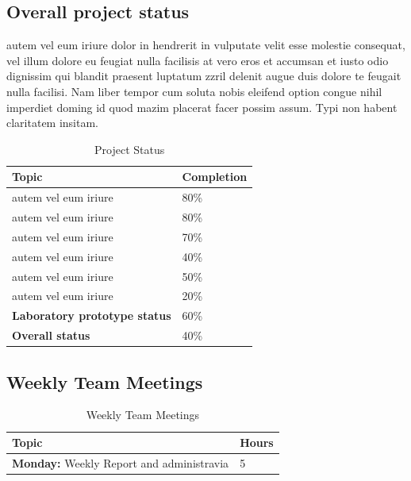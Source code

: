\documentclass[12pt,journal]{IEEEtran}
\begin{document}
	\subsection{Overall project status}
	autem vel eum iriure dolor in hendrerit in vulputate velit esse molestie consequat, vel illum dolore 
	eu feugiat nulla facilisis at vero eros et accumsan et iusto odio dignissim qui blandit praesent luptatum 
	zzril delenit augue duis dolore te feugait nulla facilisi. Nam liber tempor cum soluta nobis eleifend option 
	congue nihil imperdiet doming id quod mazim placerat facer possim assum. Typi non habent claritatem insitam.
	\begin{table}[H]
		\renewcommand{\arraystretch}{1.3}
		\caption{Project Status}
		\label{Project Status}
		\centering
		\begin{tabular}{p{4cm}|p{2cm}}
			\hline
			{\bfseries 	Topic} 															&{\bfseries Completion}	\\
			\hline\hline				
						{autem vel eum iriure} 										& 80\% 									\\
						{autem vel eum iriure} 										& 80\% 	 								\\
						{autem vel eum iriure} 										& 70\% 	 								\\
						{autem vel eum iriure} 										& 40\% 									\\
						{autem vel eum iriure} 										& 50\% 									\\
						{autem vel eum iriure} 										& 20\% 									\\
						\hline \hline				
						{\bfseries Laboratory prototype status} 	& 60\% 									\\
						{\bfseries Overall status} 								& 40\% 									\\					
			\hline
		\end{tabular}
	\end{table}

	\subsection{Weekly Team Meetings}
		\begin{table}[H]
			\renewcommand{\arraystretch}{1.3}
			\caption{Weekly Team Meetings}
			\label{Weekly Team Meetings}
			\centering
			\begin{tabular}{p{5cm}|p{1cm}}
				\hline
				{\bfseries 	Topic} 																						&{\bfseries Hours}		\\
				\hline\hline
							{\bfseries Monday:} Weekly Report and administravia			& 5 	 								\\
				\hline
			\end{tabular}
		\end{table}
				
\end{document}
